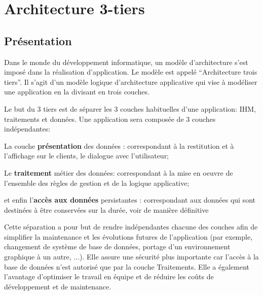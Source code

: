 \section{Architecture 3-tiers}
\label{ch:3-tiers}

\subsection{Présentation}

Dans le monde du développement informatique, un modèle d’architecture s’est imposé dans la réalisation d’application. Le modèle est appelé “Architecture trois tiers”. 
Il s’agit d’un modèle logique d’architecture applicative qui vise à modéliser une application en la divisant en trois couches.

Le but du 3 tiers est de séparer les 3 couches habituelles d’une application: IHM, traitements et données.
Une application sera composée de 3 couches indépendantes:

\begin{center}
\label{Graphique technologie ajax}
\end{center}
 

\begin{list}{•}{}

  \item 
   La couche \textbf{présentation} des données : correspondant à la restitution et à l’affichage sur le clients, le dialogue avec l’utilisateur;
  
  \item
  Le \textbf{traitement} métier des données: correspondant à la mise en oeuvre de l'ensemble des règles de gestion et de la logique applicative;
  
  \item
  et enfin l’\textbf{accès aux données} persistantes : correspondant aux données qui sont destinées à être conservées sur la durée, voir de manière définitive   
  
\end{list}

Cette séparation a pour but de rendre indépendantes chacune des couches afin de simplifier la maintenance et les évolutions futures de l'application (par exemple, changement de système de base de données, portage d'un environnement graphique à un autre, ...).
Elle assure une sécurité plus importante car l'accès à la base de données n'est autorisé que par la couche Traitements.
Elle a également l'avantage d'optimiser le travail en équipe et de réduire les coûts de développement et de maintenance.

